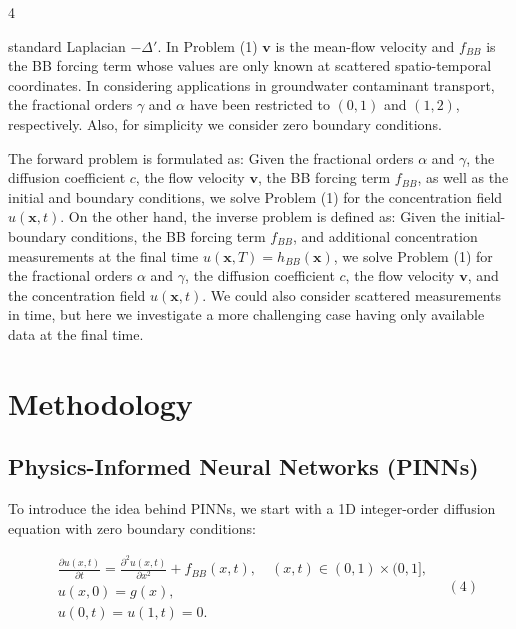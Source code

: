 \documentclass[UTF8]{article}
\begin{document}
4

standard Laplacian $-\Delta'$. In Problem (1) $\boldsymbol{v}$ is the mean-flow velocity and $f_{BB}$ is the BB forcing term whose values are only known at scattered spatio-temporal coordinates. In considering applications in groundwater contaminant transport, the fractional orders $\gamma$ and $\alpha$ have been restricted to $(0, 1)$ and $(1, 2)$, respectively. Also, for simplicity we consider zero boundary conditions.

The forward problem is formulated as: Given the fractional orders $\alpha$ and $\gamma$, the diffusion coefficient $c$, the flow velocity $\boldsymbol{v}$, the BB forcing term $f_{BB}$, as well as the initial and boundary conditions, we solve Problem (1) for the concentration field $u(\boldsymbol{x}, t)$. On the other hand, the inverse problem is defined as: Given the initial-boundary conditions, the BB forcing term $f_{BB}$, and additional concentration measurements at the final time $u(\boldsymbol{x}, T) = h_{BB}(\boldsymbol{x})$, we solve Problem (1) for the fractional orders $\alpha$ and $\gamma$, the diffusion coefficient $c$, the flow velocity $\boldsymbol{v}$, and the concentration field $u(\boldsymbol{x}, t)$. We could also consider scattered measurements in time, but here we investigate a more challenging case having only available data at the final time.

\section{Methodology}

\subsection{Physics-Informed Neural Networks (PINNs)}

To introduce the idea behind PINNs, we start with a 1D integer-order diffusion equation with zero boundary conditions:

$$
\begin{aligned}
&\frac{\partial u(x, t)}{\partial t} = \frac{\partial^2 u(x, t)}{\partial x^2} + f_{BB}(x, t), \quad (x, t) \in (0, 1) \times (0, 1], \\
&u(x, 0) = g(x), \\
&u(0, t) = u(1, t) = 0.
\end{aligned} \quad (4)
$$
\end{document}
